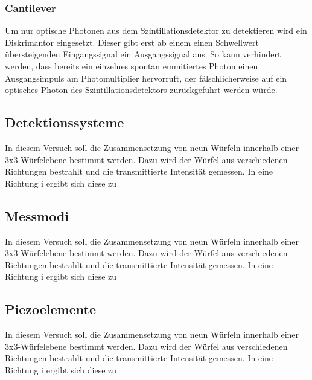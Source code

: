         \subsubsection*{Cantilever}
          Um nur optische Photonen aus dem Szintillationsdetektor zu detektieren wird ein Diskrimantor eingesetzt. Dieser gibt erst ab einem einen Schwellwert übersteigenden Eingangssignal ein Ausgangssignal 
          aus. So kann verhindert werden, dass bereits ein einzelnes spontan emmitiertes Photon einen Ausgangsimpuls am Photomultiplier hervorruft, der fälschlicherweise auf ein optisches Photon des 
          Szintillationsdetektors zurückgeführt werden würde.



      \newpage
      \subsection{Detektionssysteme}
          In diesem Versuch soll die Zusammensetzung von neun Würfeln innerhalb einer 3x3-Würfelebene bestimmt werden. Dazu wird der Würfel aus verschiedenen Richtungen bestrahlt und die transmittierte 
          Intensität gemessen. In eine Richtung i ergibt sich diese zu


      

      \newpage
      \subsection{Messmodi}
          In diesem Versuch soll die Zusammensetzung von neun Würfeln innerhalb einer 3x3-Würfelebene bestimmt werden. Dazu wird der Würfel aus verschiedenen Richtungen bestrahlt und die transmittierte 
          Intensität gemessen. In eine Richtung i ergibt sich diese zu

      
      
      
      \newpage
      \subsection{Piezoelemente}
          In diesem Versuch soll die Zusammensetzung von neun Würfeln innerhalb einer 3x3-Würfelebene bestimmt werden. Dazu wird der Würfel aus verschiedenen Richtungen bestrahlt und die transmittierte 
          Intensität gemessen. In eine Richtung i ergibt sich diese zu



           

